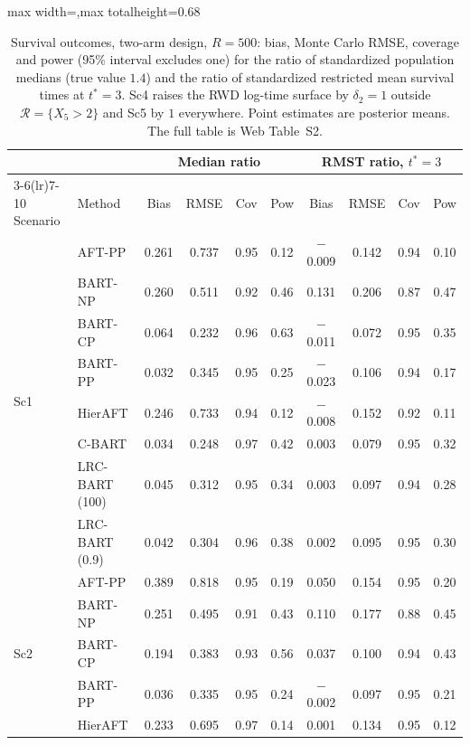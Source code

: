 \begin{table}[htbp]
\centering
\singlespacing
\caption{Survival outcomes, two-arm design, $R=500$: bias, Monte Carlo RMSE, coverage and power (95\% interval excludes one) for the ratio of standardized population medians (true value $1.4$) and the ratio of standardized restricted mean survival times at $t^\ast=3$. Sc4 raises the RWD log-time surface by $\delta_2=1$ outside $\mathcal R=\{X_5>2\}$ and Sc5 by $1$ everywhere. Point estimates are posterior means. The full table is Web Table~S2.}
\label{tab:surv}
\scriptsize
\setlength{\tabcolsep}{4pt}
\renewcommand{\arraystretch}{0.8}
\begin{adjustbox}{max width=\textwidth,max totalheight=0.68\textheight}
\begin{tabular}{llcccccccc}
\toprule
& & \multicolumn{4}{c}{Median ratio} & \multicolumn{4}{c}{RMST ratio, $t^\ast=3$} \\
\cmidrule(lr){3-6}\cmidrule(lr){7-10}
Scenario & Method & Bias & RMSE & Cov & Pow & Bias & RMSE & Cov & Pow \\
\midrule
\multirow{8}{*}{Sc1} & AFT-PP & 0.261 & 0.737 & 0.95 & 0.12 & $-$0.009 & 0.142 & 0.94 & 0.10 \\
& BART-NP & 0.260 & 0.511 & 0.92 & 0.46 & 0.131 & 0.206 & 0.87 & 0.47 \\
& BART-CP & 0.064 & 0.232 & 0.96 & 0.63 & $-$0.011 & 0.072 & 0.95 & 0.35 \\
& BART-PP & 0.032 & 0.345 & 0.95 & 0.25 & $-$0.023 & 0.106 & 0.94 & 0.17 \\
& HierAFT & 0.246 & 0.733 & 0.94 & 0.12 & $-$0.008 & 0.152 & 0.92 & 0.11 \\
& C-BART & 0.034 & 0.248 & 0.97 & 0.42 & 0.003 & 0.079 & 0.95 & 0.32 \\
& LRC-BART (100) & 0.045 & 0.312 & 0.95 & 0.34 & 0.003 & 0.097 & 0.94 & 0.28 \\
& LRC-BART (0.9) & 0.042 & 0.304 & 0.96 & 0.38 & 0.002 & 0.095 & 0.95 & 0.30 \\
\midrule
\multirow{8}{*}{Sc2} & AFT-PP & 0.389 & 0.818 & 0.95 & 0.19 & 0.050 & 0.154 & 0.95 & 0.20 \\
& BART-NP & 0.251 & 0.495 & 0.91 & 0.43 & 0.110 & 0.177 & 0.88 & 0.45 \\
& BART-CP & 0.194 & 0.383 & 0.93 & 0.56 & 0.037 & 0.100 & 0.94 & 0.43 \\
& BART-PP & 0.036 & 0.335 & 0.95 & 0.24 & $-$0.002 & 0.097 & 0.95 & 0.21 \\
& HierAFT & 0.233 & 0.695 & 0.97 & 0.14 & 0.001 & 0.134 & 0.95 & 0.12 \\

\end{tabular}
\end{adjustbox}
\end{table}
